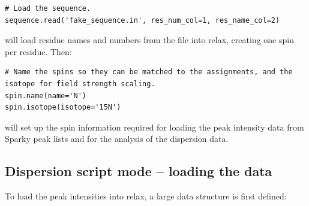 \begin{lstlisting}[firstnumber=45]
# Load the sequence.
sequence.read('fake_sequence.in', res_num_col=1, res_name_col=2)
\end{lstlisting}

will load residue names and numbers from the  file into relax, creating one spin per residue.
Then:

\begin{lstlisting}[firstnumber=48]
# Name the spins so they can be matched to the assignments, and the isotope for field strength scaling.
spin.name(name='N')
spin.isotope(isotope='15N')
\end{lstlisting}

will set up the spin information required for loading the peak intensity data from Sparky peak lists and for the analysis of the dispersion data.



\subsection{Dispersion script mode -- loading the data}

To load the peak intensities into relax, a large data structure is first defined:

